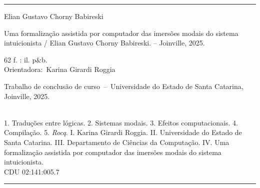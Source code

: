 \begin{titlepage}
	\vspace*{\fill}					%
	\hrule							%
	\begin{center}					%
	\begin{minipage}[c]{12.5cm}		%
	
	\textsf{Elian Gustavo Chorny Babireski}
	
	\hspace{0.5cm} \textsf{Uma formalização assistida por computador das imersões modais do sistema intuicionista  / Elian Gustavo Chorny Babireski. --
	Joinville, 2025.}
	
	\hspace{0.5cm} \textsf{62 f. : il. p\&b.}\\
	
	\hspace{0.5cm} \textsf{Orientadora:~Karina Girardi Roggia}\\
	
	\hspace{0.5cm}
	\parbox[t]{\textwidth}{\textsf{Trabalho de conclusão de curso~--~Universidade do Estado de Santa Catarina, Joinville,
	2025.}}\\
	
	\hspace{0.5cm}
		\textsf{1. Traduções entre lógicas.}
		\textsf{2. Sistemas modais.}
        \textsf{3. Efeitos computacionais.}
        \textsf{4. Compilação.}
        \textsf{5. \emph{Rocq}.}
		\textsf{I. Karina Girardi Roggia.}
		\textsf{II. Universidade do Estado de Santa Catarina.}
		\textsf{III. Departamento de Ciências da Computação.}
		\textsf{IV. Uma formalização assistida por computador das imersões modais do sistema intuicionista.}\\ 			
	
	\hspace{8.75cm} \textsf{CDU 02:141:005.7}\\
	
	\end{minipage}
	\end{center}
	\hrule
\end{titlepage}